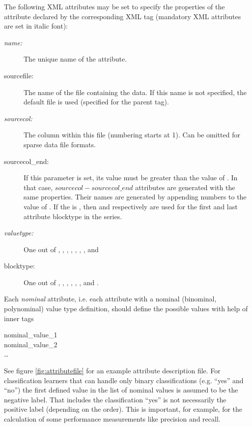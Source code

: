 {The following XML attributes may be set to specify the properties of
the \rapidminer attribute declared by the corresponding XML tag 
(mandatory XML attributes are set in italic font):
\begin{description}
\item[\textit{name:}] The unique name of the attribute.
\item[sourcefile:] The name of the file containing the data.
  If this name is not specified, the default file is used (specified for
  the parent  tag).
\item[\textit{sourcecol:}] The column within this file (numbering starts
  at 1). Can be omitted for sparse data file formats.
\item[sourcecol\_end:] If this parameter is set, its value must be
  greater than the value of . In that case,
  $sourcecol-sourcecol\_end$ attributes are generated with the same
  properties. Their names are generated by appending numbers to the
  value of . If the  is
  , then  and
   respectively are used for the first and
  last attribute blocktype in the series.
\item[\textit{valuetype:}] One out of , ,
  , , , ,
  , and 
\item[blocktype:] One out of ,
  , ,
  , ,
  , and .
\end{description}

Each \textit{nominal} attribute, i.e. each attribute with a nominal (binominal, polynominal) 
value type definition, should define the possible values with help of inner tags 
\begin{center}
nominal\_value\_1 \\
nominal\_value\_2 \\
\ldots
\end{center}

See figure \ref{fig:attributefile} for an example attribute
description file. 
For classification learners that can handle only binary classifications 
(e.g. ``yes'' and ``no'') the first defined value in the list of nominal values
is assumed to be the negative label. That includes the classification ``yes''
is not necessarily the positive label (depending on the order). This is important,
for example, for the calculation of some performance measurements like
precision and recall.

}
